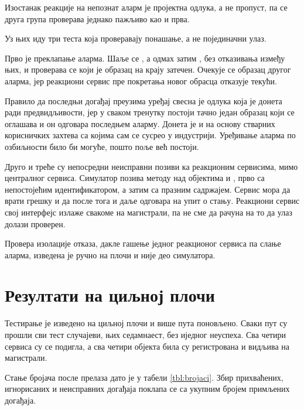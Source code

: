 \documentclass[12pt,oneside]{memoir}
\begin{document}
Изостанак реакције на непознат аларм је пројектна одлука, а не пропуст, па се друга група проверава
једнако пажљиво као и прва.

Уз њих иду три теста која проверавају понашање, а не појединачни улаз.

Прво је преклапање аларма. Шаље се , а одмах затим , без
отказивања између њих, и проверава се који је образац на крају затечен. Очекује се образац
другог аларма, јер реакциони сервис пре покретања новог обрасца отказује текући.

Правило да последњи догађај преузима уређај свесна је одлука која је донета ради
предвидљивости, јер у сваком тренутку постоји тачно један образац који се оглашава и он
одговара последњем аларму. Донета је и на основу стварних корисничких захтева са којима
сам се сусрео у индустрији. Уређивање аларма по озбиљности било би могуће, пошто поље
 већ постоји.

Друго и треће су непосредни неисправни позиви ка реакционим сервисима, мимо централног
сервиса. Симулатор позива методу  над објектима  и
, прво са непостојећим идентификатором, а затим са празним садржајем.
Сервис мора да врати грешку и да после тога и даље одговара на упит о стању. Реакциони
сервис свој интерфејс излаже свакоме на магистрали, па не сме да рачуна на то да улаз долази
проверен.

Провера изолације отказа, дакле гашење једног реакционог сервиса па слање аларма, изведена је
ручно на плочи и није део симулатора.

\section{Резултати на циљној плочи}
\label{sec:rezultati}

Тестирање је изведено на циљној плочи и више пута поновљено. Сваки пут су прошли сви тест
случајеви, њих седамнаест, без иједног неуспеха. Сва четири сервиса су се подигла, а
сва четири  објекта била су регистрована и видљива на магистрали.

Стање бројача после прелаза дато је у табели \ref{tbl:brojaci}. Збир прихваћених, игнорисаних и неисправних догађаја поклапа се са
укупним бројем примљених догађаја.
\end{document}
